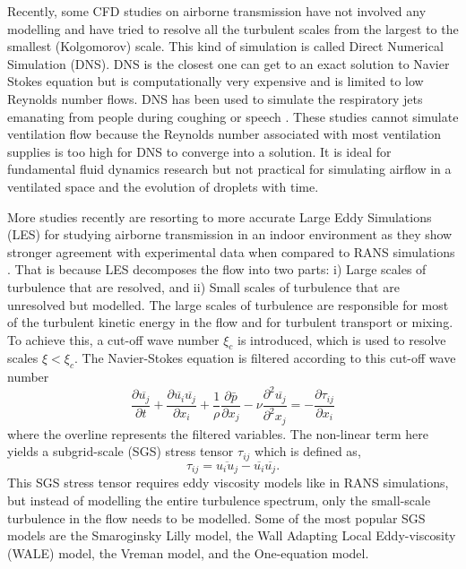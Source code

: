\documentclass[a4paper,12pt]{elsarticle}
\begin{document}
Recently, some CFD studies on airborne transmission have not involved any modelling and have tried to resolve all the turbulent scales from the largest to the smallest (Kolgomorov) scale. This kind of simulation is called Direct Numerical Simulation (DNS). DNS is the closest one can get to an exact solution to Navier Stokes equation but is computationally very expensive and is limited to low Reynolds number flows. DNS has been used to simulate the respiratory jets emanating from people during coughing \cite{rosti2020fluid,diwan2020understanding, chong2021extended} or speech \cite{giri2022colliding, singhal2022virus}. These studies cannot simulate ventilation flow because the Reynolds number associated with most ventilation supplies is too high for DNS to converge into a solution. It is ideal for fundamental fluid dynamics research but not practical for simulating airflow in a ventilated space and the evolution of droplets with time.

More studies recently are resorting to more accurate Large Eddy Simulations (LES) for studying airborne transmission in an indoor environment \cite{vuorinen2020modelling,feng2020study,khosronejad2020fluid} as they show stronger agreement with experimental data when compared to RANS simulations \cite{wu2023numerical}. That is because LES decomposes the flow into two parts: i) Large scales of turbulence that are resolved, and ii) Small scales of turbulence that are unresolved but modelled. The large scales of turbulence are responsible for most of the turbulent kinetic energy in the flow and for turbulent transport or mixing. To achieve this, a cut-off wave number $\xi_c$ is introduced, which is used to resolve scales $\xi < \xi_c$. The Navier-Stokes equation is filtered according to this cut-off wave number 
\begin{equation}
\frac{\partial \overline{u_j}}{\partial t} + \frac{\partial \overline{u_i}\overline{u_j}}{\partial x_i} + \frac{1}{\rho}\frac{\partial \bar{p}}{\partial x_j} - \nu\frac{\partial^2 \overline{u_j}}{\partial^2 x_j} = -\frac{\partial \tau_{ij}}{\partial x_i}
\label{eq:3}
\end{equation}
where the overline represents the filtered variables. The non-linear term here yields a subgrid-scale (SGS) stress tensor $\tau_{ij}$ which is defined as,
\begin{equation}
\tau_{ij} = \overline{u_iu_j} - \overline{u_i}\overline{u_j}.
\label{eq:4}
\end{equation}
This SGS stress tensor requires eddy viscosity models like in RANS simulations, but instead of modelling the entire turbulence spectrum, only the small-scale turbulence in the flow needs to be modelled. Some of the most popular SGS models are the Smaroginsky Lilly model, the Wall Adapting Local Eddy-viscosity (WALE) model, the Vreman model, and the One-equation model.
\end{document}
